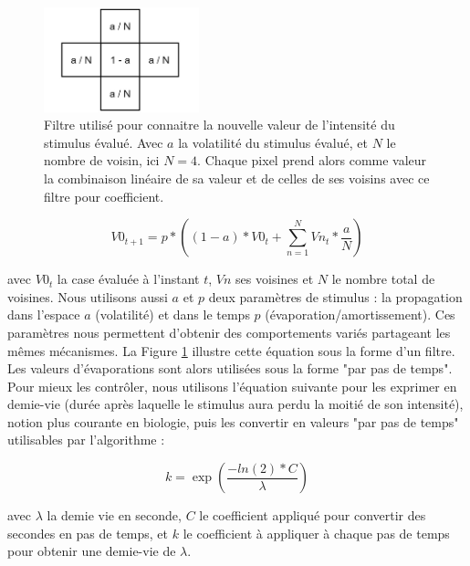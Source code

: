 			\begin{figure}
			\centering
			\includegraphics[width=0.4\textwidth]{./Pictures/Figures/flou.JPG}
			\caption[Filtre utilisé pour connaitre la nouvelle valeur de l'intensité du stimulus évalué.]{Filtre utilisé pour connaitre la nouvelle valeur de l'intensité du stimulus évalué. Avec $a$ la volatilité du stimulus évalué, et $N$ le nombre de voisin, ici $N=4$. Chaque pixel prend alors comme valeur la combinaison linéaire de sa valeur et de celles de ses voisins avec ce filtre pour coefficient.}
			\label{flou}
			\end{figure}
			
			\begin{equation}
			V0_{t+1} = p * ((1-a) * V0_t + \sum_{n=1}^{N} Vn_t * \frac{a}{N})
			\end{equation}
			
			avec $V0_t$ la case évaluée à l'instant $t$, $Vn$ ses voisines et $N$ le nombre total de voisines. Nous utilisons aussi $a$ et $p$ deux paramètres de stimulus : la propagation dans l'espace $a$ (volatilité) et dans le temps $p$ (évaporation/amortissement). Ces paramètres nous permettent d'obtenir des comportements variés partageant les mêmes mécanismes. La Figure \ref{flou} illustre cette équation sous la forme d'un filtre. Les valeurs d'évaporations sont alors utilisées sous la forme "par pas de temps". Pour mieux les contrôler, nous utilisons l'équation suivante pour les exprimer en demie-vie (durée après laquelle le stimulus aura perdu la moitié de son intensité), notion plus courante en biologie, puis les convertir en valeurs "par pas de temps" utilisables par l'algorithme :
			
			\begin{equation}
			k = \exp(\frac{-ln(2) * C}{\lambda})
			\end{equation}
			
			avec $\lambda$ la demie vie en seconde, $C$ le coefficient appliqué pour convertir des secondes en pas de temps, et $k$ le coefficient à appliquer à chaque pas de temps pour obtenir une demie-vie de $\lambda$.
			
